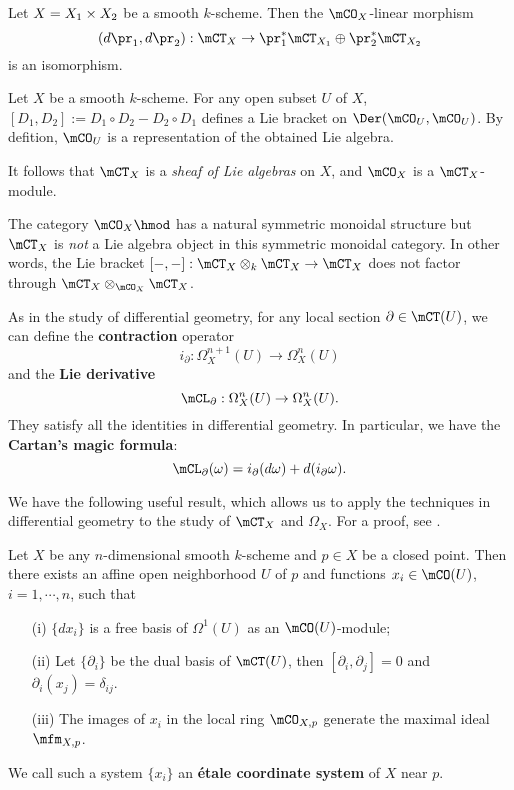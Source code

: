 	\begin{lem}
		Let $X = X_1 \mt X_2$ be a smooth $k$-scheme. Then the $\mCO_X$-linear morphism
		\[
			(d\pr_1, d\pr_2): \mCT_{X}\to \pr_1^*\mCT_{X_1} \oplus \pr_2^*\mCT_{X_2}
		\]
		is an isomorphism.
	\end{lem}

	\begin{constr}
		Let $X$ be a smooth $k$-scheme. For any open subset $U$ of $X$, $[D_1,D_2]:= D_1\circ D_2 - D_2\circ D_1$ defines a Lie bracket on $\Der( \mCO_U, \mCO_U)$. By defition, $\mCO_U$ is a representation of the obtained Lie algebra.

		It follows that $\mCT_{X}$ is a \emph{sheaf of Lie algebras} on $X$, and $\mCO_X$ is a $\mCT_{X}$-module.
	\end{constr}

	\begin{warn}
		The category $\mCO_X\hmod$ has a natural symmetric monoidal structure but $\mCT_{X}$ is \emph{not} a Lie algebra object in this symmetric monoidal category. In other words, the Lie bracket $[-,-]: \mCT_{X} \ot_k \mCT_{X} \to \mCT_{X}$ does not factor through $\mCT_{X} \ot_{\mCO_X} \mCT_{X} $.
	\end{warn}

	\begin{constr}
		As in the study of differential geometry, for any local section $\partial\in \mCT(U)$, we can define the \textbf{contraction} operator
		\[
			i_\partial: \Omega^{n+1}_X(U) \to \Omega^{n}_X(U)
		\]
		and the \textbf{Lie derivative} 
		\[
			\mCL_\partial:  \Omega^{n}_X(U)\to  \Omega^{n}_X(U).
		\]
		They satisfy all the identities in differential geometry. In particular, we have the \textbf{Cartan's magic formula}:
		\[
			\mCL_\partial(\omega) = i_\partial(d\omega) + d( i_\partial\omega ).
		\]

	\end{constr}

	We have the following useful result, which allows us to apply the techniques in differential geometry to the study of $\mCT_X$ and $\Omega_X$. For a proof, see \cite[Theorem A.5.1]{HTT}.

	\begin{propdefn}
		Let $X$ be any $n$-dimensional smooth $k$-scheme and $p\in X$ be a closed point. Then there exists an affine open neighborhood $U$ of $p$ and functions $x_i\in \mCO(U)$, $i=1,\cdots,n$, such that
		\begin{itemize}
		 	\item[(i)] 
		 		$\{dx_i\}$ is a free basis of $\Omega^1(U)$ as an $\mCO(U)$-module;
		 	\item[(ii)] 
		 		Let $\{\partial_i\}$ be the dual basis of $\mCT(U)$, then $[\partial_i,\partial_j] = 0$ and $\partial_i(x_j) = \delta_{ij}$.
		 	\item[(iii)] 
		 		The images of $x_i$ in the local ring $\mCO_{X,p}$ generate the maximal ideal $\mfm_{X,p}$.
		 \end{itemize} 
		 We call such a system $\{x_i\}$ an \textbf{étale coordinate system} of $X$ near $p$.
	\end{propdefn}

